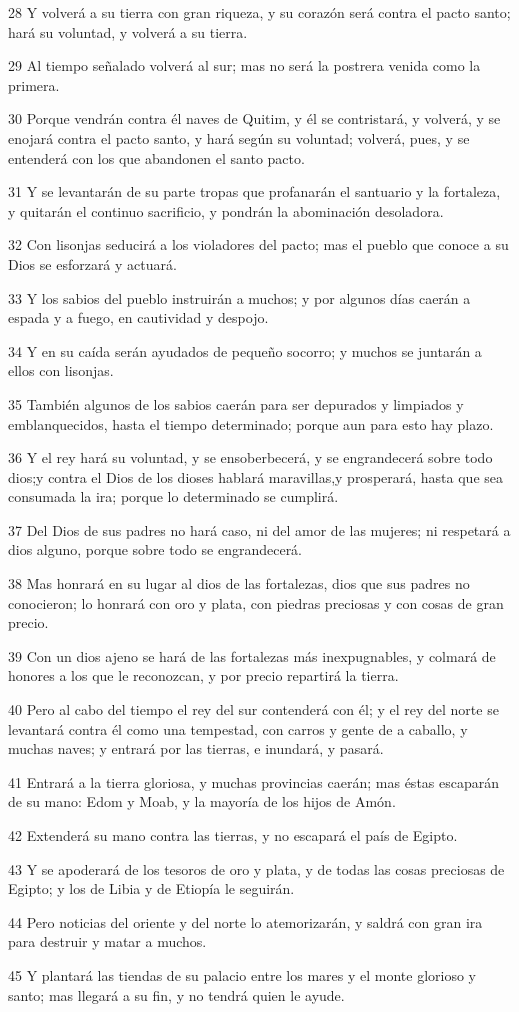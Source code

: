 \par 28 Y volverá a su tierra con gran riqueza, y su corazón será contra el pacto santo; hará su voluntad, y volverá a su tierra.
\par 29 Al tiempo señalado volverá al sur; mas no será la postrera venida como la primera.
\par 30 Porque vendrán contra él naves de Quitim, y él se contristará, y volverá, y se enojará contra el pacto santo, y hará según su voluntad; volverá, pues, y se entenderá con los que abandonen el santo pacto.
\par 31 Y se levantarán de su parte tropas que profanarán el santuario y la fortaleza, y quitarán el continuo sacrificio, y pondrán la abominación desoladora. 
\par 32 Con lisonjas seducirá a los violadores del pacto; mas el pueblo que conoce a su Dios se esforzará y actuará.
\par 33 Y los sabios del pueblo instruirán a muchos; y por algunos días caerán a espada y a fuego, en cautividad y despojo.
\par 34 Y en su caída serán ayudados de pequeño socorro; y muchos se juntarán a ellos con lisonjas.
\par 35 También algunos de los sabios caerán para ser depurados y limpiados y emblanquecidos, hasta el tiempo determinado; porque aun para esto hay plazo.
\par 36 Y el rey hará su voluntad, y se ensoberbecerá, y se engrandecerá sobre todo dios;y contra el Dios de los dioses hablará maravillas,y prosperará, hasta que sea consumada la ira; porque lo determinado se cumplirá.
\par 37 Del Dios de sus padres no hará caso, ni del amor de las mujeres; ni respetará a dios alguno, porque sobre todo se engrandecerá.
\par 38 Mas honrará en su lugar al dios de las fortalezas, dios que sus padres no conocieron; lo honrará con oro y plata, con piedras preciosas y con cosas de gran precio.
\par 39 Con un dios ajeno se hará de las fortalezas más inexpugnables, y colmará de honores a los que le reconozcan, y por precio repartirá la tierra.
\par 40 Pero al cabo del tiempo el rey del sur contenderá con él; y el rey del norte se levantará contra él como una tempestad, con carros y gente de a caballo, y muchas naves; y entrará por las tierras, e inundará, y pasará.
\par 41 Entrará a la tierra gloriosa, y muchas provincias caerán; mas éstas escaparán de su mano: Edom y Moab, y la mayoría de los hijos de Amón.
\par 42 Extenderá su mano contra las tierras, y no escapará el país de Egipto.
\par 43 Y se apoderará de los tesoros de oro y plata, y de todas las cosas preciosas de Egipto; y los de Libia y de Etiopía le seguirán.
\par 44 Pero noticias del oriente y del norte lo atemorizarán, y saldrá con gran ira para destruir y matar a muchos. 
\par 45 Y plantará las tiendas de su palacio entre los mares y el monte glorioso y santo; mas llegará a su fin, y no tendrá quien le ayude.

